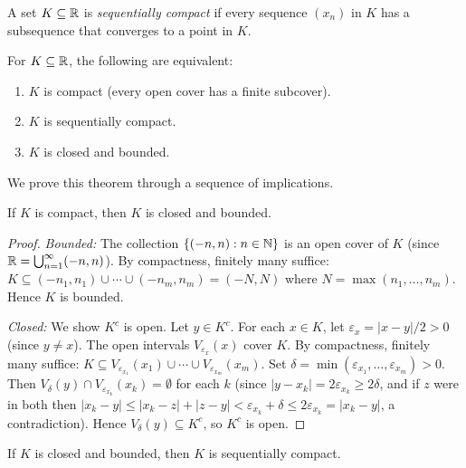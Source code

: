 \documentclass[11pt,a4paper]{article}
\begin{document}
\begin{definition}
\label{def:seq_compact}
A set $K \subseteq \mathbb{R}$ is \emph{sequentially compact} if every sequence
$(x_n)$ in $K$ has a subsequence that converges to a point in $K$.
\end{definition}

\begin{theorem}
\label{thm:compact_equiv}
For $K \subseteq \mathbb{R}$, the following are equivalent:
\begin{enumerate}[nosep,label=(\roman*)]
  \item $K$ is compact (every open cover has a finite subcover).
  \item $K$ is sequentially compact.
  \item $K$ is closed and bounded.
\end{enumerate}
\end{theorem}

We prove this theorem through a sequence of implications.

\begin{lemma}
\label{lem:compact_closed_bounded}
If $K$ is compact, then $K$ is closed and bounded.
\end{lemma}

\begin{proof}
\emph{Bounded:} The collection $\{(-n, n) : n \in \mathbb{N}\}$ is an open cover
of $K$ (since $\mathbb{R} = \bigcup_{n=1}^\infty (-n, n)$). By compactness,
finitely many suffice: $K \subseteq (-n_1, n_1) \cup \cdots \cup
(-n_m, n_m) = (-N, N)$ where $N = \max(n_1, \ldots, n_m)$. Hence $K$ is
bounded.

\emph{Closed:} We show $K^c$ is open. Let $y \in K^c$. For each
$x \in K$, let $\varepsilon_x = |x - y|/2 > 0$ (since $y \neq x$). The
open intervals $V_{\varepsilon_x}(x)$ cover $K$. By compactness, finitely
many suffice: $K \subseteq V_{\varepsilon_{x_1}}(x_1) \cup \cdots \cup
V_{\varepsilon_{x_m}}(x_m)$. Set
$\delta = \min(\varepsilon_{x_1}, \ldots, \varepsilon_{x_m}) > 0$. Then
$V_\delta(y) \cap V_{\varepsilon_{x_k}}(x_k) = \emptyset$ for each $k$
(since $|y - x_k| = 2\varepsilon_{x_k} \ge 2\delta$, and if $z$ were in
both then $|x_k - y| \le |x_k - z| + |z - y| < \varepsilon_{x_k} + \delta
\le 2\varepsilon_{x_k} = |x_k - y|$, a contradiction). Hence
$V_\delta(y) \subseteq K^c$, so $K^c$ is open.
\end{proof}

\begin{lemma}
\label{lem:closed_bounded_seq}
If $K$ is closed and bounded, then $K$ is sequentially compact.
\end{lemma}
\end{document}
